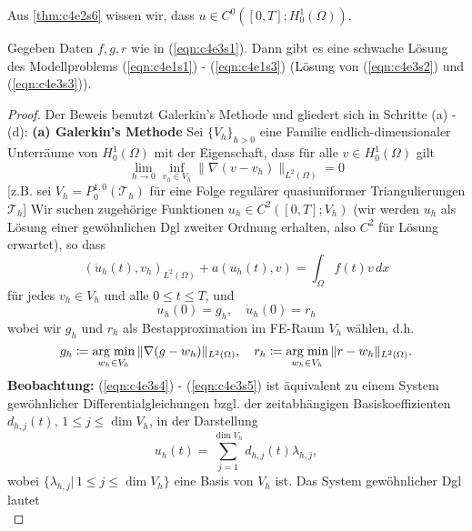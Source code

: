 \documentclass[../skript.tex]{subfiles}
\begin{document}
\begin{remark}\label{rem:c4e3s2}
	Aus \cref{thm:c4e2s6} wissen wir, dass $u\in C^0([0,T];H^1_0(\Omega))$.
\end{remark}

\begin{theorem}\label{thm:c4e3s3}
	Gegeben Daten $f,g,r$ wie in (\ref{eqn:c4e3s1}). Dann gibt es eine schwache Lösung des Modellproblems (\ref{eqn:c4e1s1}) - (\ref{eqn:c4e1s3}) (Lösung von (\ref{eqn:c4e3s2}) und (\ref{eqn:c4e3s3})).
\end{theorem}

\begin{proof}
	Der Beweis benutzt Galerkin's Methode und gliedert sich in Schritte (a) - (d):\newline\newline\noindent
	\textbf{(a) Galerkin's Methode  } Sei $\{V_h\}_{h>0}$ eine Familie endlich-dimensionaler Unterräume von $H^1_0(\Omega)$ mit der Eigenschaft, dass für alle $v\in H^1_0(\Omega)$ gilt
	\[
		\lim_{h\to 0}\inf_{v_h\in V_h} \|\nabla(v-v_h)\|_{L^2(\Omega)} = 0
	\]	
	[z.B. sei $V_h = P^{1,0}_0(\mathcal{T}_h)$ für eine Folge regulärer quasiuniformer Triangulierungen $\mathcal{T}_h$]\newline\noindent
	Wir suchen zugehörige Funktionen $u_h\in C^2([0,T];V_h)$ (wir werden $u_h$ als Lösung einer gewöhnlichen Dgl zweiter Ordnung erhalten, also $C^2$ für Lösung erwartet), so dass 
	\begin{equation}\label{eqn:c4e3s4}
		(\ddot{u}_h (t), v_h)_{L^2(\Omega)} + a(u_h(t),v) = \int_\Omega f(t)v\,dx
	\end{equation}
	für jedes $v_h\in V_h$ und alle $0\leq t\leq T$, und 
	\begin{equation}\label{eqn:c4e3s5}
		u_h(0) = g_h, \quad\dot{u}_h(0) = r_h
	\end{equation} 
	wobei wir $g_h$ und $r_h$ als Bestapproximation im FE-Raum $V_h$ wählen, d.h.
	\[
		g_h\coloneqq \operatorname*{arg\;min}_{w_h\in V_h} \|\nabla (g-w_h)\|_{L^2(\Omega)},\quad r_h\coloneqq\operatorname*{arg\;min}_{w_h\in V_h}\|r-w_h\|_{L^2(\Omega)}.
	\]
	\textbf{Beobachtung: } (\ref{eqn:c4e3s4}) - (\ref{eqn:c4e3s5}) ist äquivalent zu einem System gewöhnlicher Differentialgleichungen bzgl. der zeitabhängigen Basiskoeffizienten $d_{h,j}(t),\,1\leq j\leq\dim{V_h}$, in der Darstellung
	\[
		u_h(t) = \sum_{j=1}^{\dim{V_h}} d_{h,j}(t)\lambda_{h,j},
	\]
	wobei $\{\lambda_{h,j}|\,1\leq j\leq\dim{V_h}\}$ eine Basis von $V_h$ ist. Das System gewöhnlicher Dgl lautet
	\begin{equation}\label{eqn:c4e3s7}

\end{equation}
\end{proof}
\end{document}
